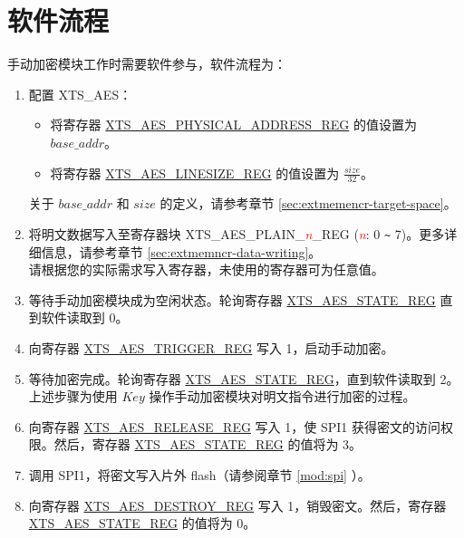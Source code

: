 \documentclass[main\_\_CN.tex]{subfiles}
\begin{document}
\section{ 软件流程 }
手动加密模块工作时需要软件参与，软件流程为：

\begin{enumerate}
    
    \item 配置 XTS\_AES： 
    \begin{itemize}
        \item 将寄存器 \hyperref[regdesc:XTSAESPHYSICALADDRESSREG]{XTS\_AES\_PHYSICAL\_ADDRESS\_REG} 的值设置为 \begin{math}base\_addr\end{math}。
        \item 将寄存器 \hyperref[regdesc:XTSAESLINESIZEREG]{XTS\_AES\_LINESIZE\_REG} 的值设置为 \begin{math}\frac{size}{32}\end{math}。
    \end{itemize}
    关于 \begin{math} base\_addr\end{math} 和 \begin{math}size\end{math} 的定义，请参考章节 \ref{sec:extmemencr-target-space}。
    \item 将明文数据写入至寄存器块 XTS\_AES\_PLAIN\_\textcolor{red}{\it{n}}\_REG (\textcolor{red}{\it{n}}: 0 \verb+~+ 7)。更多详细信息，请参考章节 \ref{sec:extmemncr-data-writing}。\\请根据您的实际需求写入寄存器，未使用的寄存器可为任意值。
    
    \item 等待手动加密模块成为空闲状态。轮询寄存器 \hyperref[regdesc:XTSAESSTATEREG]{XTS\_AES\_STATE\_REG} 直到软件读取到 0。
    
    \item 向寄存器 \hyperref[regdesc:XTSAESTRIGGERREG]{XTS\_AES\_TRIGGER\_REG} 写入 1，启动手动加密。
    
    \item 等待加密完成。轮询寄存器 \hyperref[regdesc:XTSAESSTATEREG]{XTS\_AES\_STATE\_REG}，直到软件读取到 2。\\
    上述步骤为使用 \begin{math}Key\end{math} 操作手动加密模块对明文指令进行加密的过程。
    
    \item 向寄存器 \hyperref[regdesc:XTSAESRELEASEREG]{XTS\_AES\_RELEASE\_REG} 写入 1，使 SPI1 获得密文的访问权限。然后，寄存器 \hyperref[regdesc:XTSAESSTATEREG]{XTS\_AES\_STATE\_REG} 的值将为 3。
    
    \item 调用 SPI1，将密文写入片外 flash（请参阅章节 \ref{mod:spi} \textit{}）。
    
    \item 向寄存器 \hyperref[regdesc:XTSAESDESTROYREG]{XTS\_AES\_DESTROY\_REG} 写入 1，销毁密文。然后，寄存器 \hyperref[regdesc:XTSAESSTATEREG]{XTS\_AES\_STATE\_REG} 的值将为 0。
    
\end{enumerate}
\end{document}
